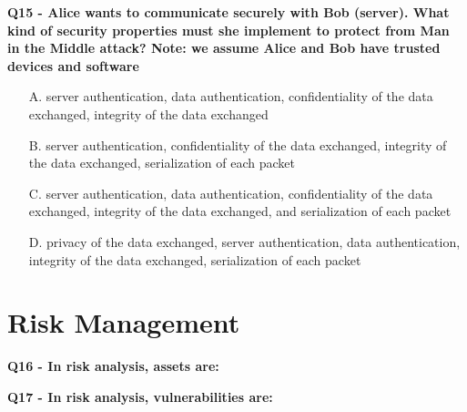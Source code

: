 \textbf{Q15 - Alice wants to communicate securely with Bob (server). What kind of security properties must she implement to protect from Man in the Middle attack? Note: we assume Alice and Bob have trusted devices and software}
\begin{enumerate}
    \item[A.] server authentication, data authentication, confidentiality of the data exchanged, integrity of the data exchanged
    \item[B.] server authentication, confidentiality of the data exchanged, integrity of the data exchanged, serialization of each packet
    \item[C.] server authentication, data authentication, confidentiality of the data exchanged, integrity of the data exchanged, and serialization of each packet
    \item[D.] privacy of the data exchanged, server authentication, data authentication, integrity of the data exchanged, serialization of each packet
\end{enumerate}


\section*{Risk Management}


\textbf{Q16 - In risk analysis, assets are:}

\textbf{Q17 - In risk analysis, vulnerabilities are:}

